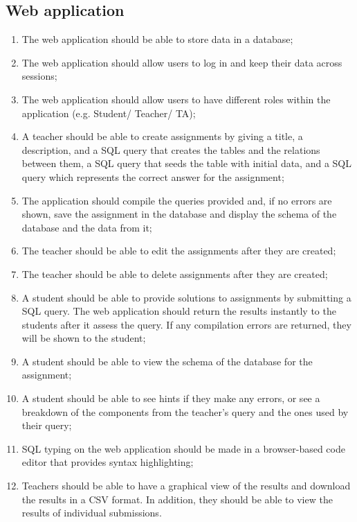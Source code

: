 \subsection{Web application}
\begin{enumerate}[label=R-\arabic*]
  \item The web application should be able to store data in a database;
  \item The web application should allow users to log in and keep their data
    across sessions;
  \item The web application should allow users to have different roles within the
    application (e.g. Student/ Teacher/ TA);
  \item  A teacher should be able to create assignments by giving a title, a description, and a SQL query that creates the tables and the relations between them, a SQL query that seeds the table with initial data, and a SQL query which represents the correct answer for the assignment;
  \item The application should compile the queries provided and, if no errors are shown, save the assignment in the database and display the schema of the database and the data from it;
  \item The teacher should be able to edit the assignments after they are created;
  \item The teacher should be able to delete assignments after they are created;
  \item A student should be able to provide solutions to assignments by submitting a SQL query. The web application should return the results instantly to the students after it assess the query. If any compilation errors are returned, they will be shown to the student;
  \item A student should be able to view the schema of the database for the assignment;
  \item A student should be able to see hints if they make any errors, or see a breakdown of the components from the teacher's query and the ones used by their query;
  \item SQL typing on the web application should be made in a browser-based code editor that provides syntax highlighting;
  \item Teachers should be able to have a graphical view of the results and download the results in a CSV format. In addition, they should be able to view the results of individual submissions.
\end{enumerate}

